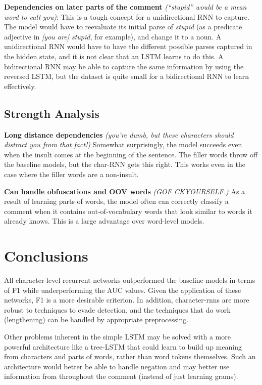 \documentclass{article} %
\begin{document}
\textbf{Dependencies on later parts of the comment} \textit{(``stupid'' would be a mean word to call you)}:
This is a tough concept for a unidirectional RNN to capture. The model would have to reevaluate its initial parse of \textit{stupid} (as a predicate adjective in \textit{[you are] stupid}, for example), and change it to a noun. A unidirectional RNN would have to have the different possible parses captured in the hidden state, and it is not clear that an LSTM learns to do this. A bidirectional RNN may be able to capture the same information by using the reversed LSTM, but the dataset is quite small for a bidirectional RNN to learn effectively.

\subsection*{Strength Analysis}
\textbf{Long distance dependencies} \textit{(you're dumb, but these characters should distract you from that fact!)}
Somewhat surprisingly, the model succeeds even when the insult comes at the beginning of the sentence. The filler words throw off the baseline models, but the char-RNN gets this right. This works even in the case where the filler words are a non-insult.

\textbf{Can handle obfuscations and OOV words} \textit{(GOF CKYOURSELF.)}
As a result of learning parts of words, the model often can correctly classify a comment when it contains out-of-vocabulary words that look similar to words it already knows. This is a large advantage over word-level models.


\section*{Conclusions}
All character-level recurrent networks outperformed the baseline models in terms of F1 while underperforming the AUC values. Given the application of these networks, F1 is a more desirable criterion. In addition, character-rnns are more robust to techniques to evade detection, and the techniques that do work (lengthening) can be handled by appropriate preprocessing. 

Other problems inherent in the simple LSTM may be solved with a more powerful architecture like a tree-LSTM that could learn to build up meaning from characters and parts of words, rather than word tokens themselves. Such an architecture would better be able to handle negation and may better use information from throughout the comment (instead of just learning grams). 
\end{document}
